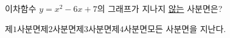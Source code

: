 \hspace*{2mm}\begin{minipage}[t]{\dimexpr\linewidth-2mm\relax}\vspace{0pt}
이차함수 $y=x^2-6x+7$의 그래프가 지나지 \underline{않는} 사분면은?
\begin{choicesii}{제$1$사분면}{제$2$사분면}{제$3$사분면}{제$4$사분면}{모든 사분면을 지난다.}\end{choicesii}\end{minipage}
